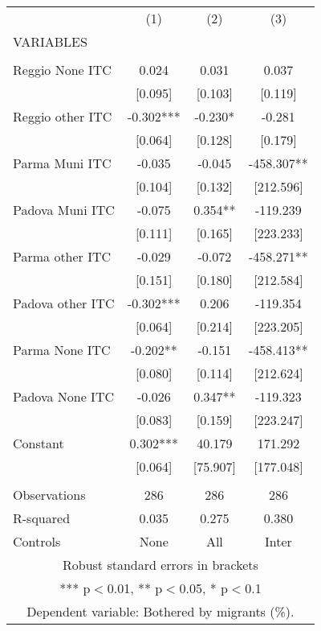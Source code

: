 \begin{tabular}{lccc} \hline
 & (1) & (2) & (3) \\
VARIABLES &  &  &  \\ \hline
 &  &  &  \\
Reggio None ITC & 0.024 & 0.031 & 0.037 \\
 & [0.095] & [0.103] & [0.119] \\
Reggio other ITC & -0.302*** & -0.230* & -0.281 \\
 & [0.064] & [0.128] & [0.179] \\
Parma Muni ITC & -0.035 & -0.045 & -458.307** \\
 & [0.104] & [0.132] & [212.596] \\
Padova Muni ITC & -0.075 & 0.354** & -119.239 \\
 & [0.111] & [0.165] & [223.233] \\
Parma other ITC & -0.029 & -0.072 & -458.271** \\
 & [0.151] & [0.180] & [212.584] \\
Padova other ITC & -0.302*** & 0.206 & -119.354 \\
 & [0.064] & [0.214] & [223.205] \\
Parma None ITC & -0.202** & -0.151 & -458.413** \\
 & [0.080] & [0.114] & [212.624] \\
Padova None ITC & -0.026 & 0.347** & -119.323 \\
 & [0.083] & [0.159] & [223.247] \\
Constant & 0.302*** & 40.179 & 171.292 \\
 & [0.064] & [75.907] & [177.048] \\
 &  &  &  \\
Observations & 286 & 286 & 286 \\
R-squared & 0.035 & 0.275 & 0.380 \\
 Controls & None & All & Inter \\ \hline
\multicolumn{4}{c}{ Robust standard errors in brackets} \\
\multicolumn{4}{c}{ *** p$<$0.01, ** p$<$0.05, * p$<$0.1} \\
\multicolumn{4}{c}{ Dependent variable: Bothered by migrants (\%).} \\
\end{tabular}
